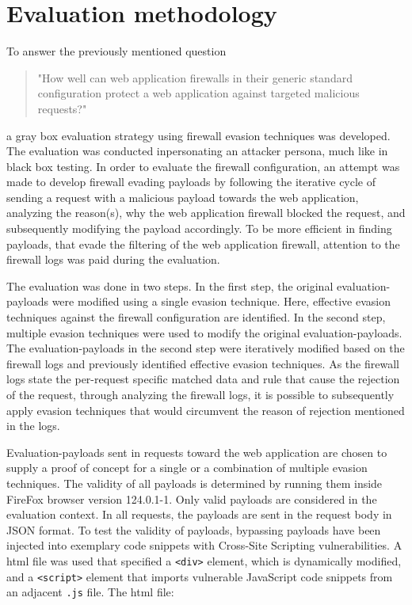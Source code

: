 \section{Evaluation methodology}
\label{sec:evaluation}
To answer the previously mentioned question
\begin{quote} "How well can web application firewalls in their generic standard configuration protect a web application against targeted malicious requests?"
\end{quote}
a gray box evaluation strategy using firewall evasion techniques was developed. The evaluation was conducted inpersonating an attacker persona, much like in black box testing.
In order to evaluate the firewall configuration, an attempt was made to develop firewall evading payloads by following the iterative cycle of sending a request with a malicious payload towards the web application, analyzing the reason(s), why the web application firewall blocked the request, and subsequently modifying the payload accordingly. 
To be more efficient in finding payloads, that evade the filtering of the web application firewall, attention to the firewall logs was paid during the evaluation.

The evaluation was done in two steps. In the first step, the original evaluation-payloads were modified using a single evasion technique. Here, effective evasion techniques against the firewall configuration are identified.
In the second step, multiple evasion techniques were used to modify the original evaluation-payloads. 
The evaluation-payloads in the second step were iteratively modified based on the firewall logs and previously identified effective evasion techniques.
As the firewall logs state the per-request specific matched data and rule that cause the rejection of the request, through analyzing the firewall logs, it is possible to subsequently apply evasion techniques that would circumvent the reason of rejection mentioned in the logs.

Evaluation-payloads sent in requests toward the web application are chosen to supply a proof of concept for a single or a combination of multiple evasion techniques. The validity of all payloads is determined by running them inside FireFox browser version 124.0.1-1. Only valid payloads are considered in the evaluation context. %
In all requests, the payloads are sent in the request body in JSON format.
To test the validity of payloads, bypassing payloads have been injected into exemplary code snippets with Cross-Site Scripting vulnerabilities. A \acrshort{html} file was used that specified a \verb|<div>| element, which is dynamically modified, and a \verb|<script>| element that imports vulnerable JavaScript code snippets from an adjacent \verb|.js| file. The \acrshort{html} file:

